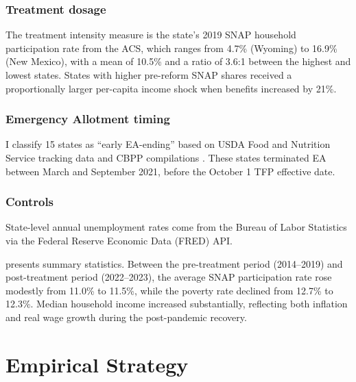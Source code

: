 \documentclass[12pt]{article}
\begin{document}
\subsubsection*{Treatment dosage} The treatment intensity measure is the state's 2019 SNAP household participation rate from the ACS, which ranges from 4.7\% (Wyoming) to 16.9\% (New Mexico), with a mean of 10.5\% and a ratio of 3.6:1 between the highest and lowest states. States with higher pre-reform SNAP shares received a proportionally larger per-capita income shock when benefits increased by 21\%.

\subsubsection*{Emergency Allotment timing} I classify 15 states as ``early EA-ending'' based on USDA Food and Nutrition Service tracking data and CBPP compilations \citep{cbpp_ea_tracker}. These states terminated EA between March and September 2021, before the October 1 TFP effective date.

\subsubsection*{Controls} State-level annual unemployment rates come from the Bureau of Labor Statistics via the Federal Reserve Economic Data (FRED) API.

 presents summary statistics. Between the pre-treatment period (2014--2019) and post-treatment period (2022--2023), the average SNAP participation rate rose modestly from 11.0\% to 11.5\%, while the poverty rate declined from 12.7\% to 12.3\%. Median household income increased substantially, reflecting both inflation and real wage growth during the post-pandemic recovery.



\section{Empirical Strategy}
\label{sec:strategy}
\end{document}
